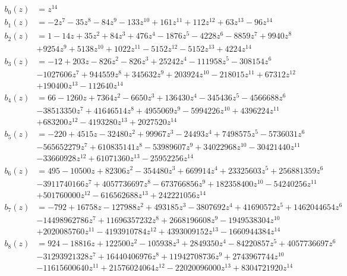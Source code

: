 \documentclass[reqno]{amsart}
\theoremstyle{definition}
\theoremstyle{remark}
\numberwithin{equation}{section}
\begin{document}
\begin{align*}
b_0(z) &= z^{14}\\
b_1(z) 
&= -2 z^7 - 35 z^8 - 84 z^9 - 133 z^{10} + 161 z^{11} + 112 z^{12} + 63 z^{13} - 96 z^{14}\\
b_2(z) 
&= 1 - 14 z + 35 z^2 + 84 z^3 + 476 z^4 - 1876 z^5 - 4228 z^6 - 8859 z^7 + 9940 z^8\\ 
&+ 9254 z^9 + 5138 z^{10} + 1022 z^{11} - 5152 z^{12} - 5152 z^{13} + 4224 z^{14}\\
b_3(z)
&= -12 + 203 z - 826 z^2 - 826 z^3 + 25242 z^4 - 111958 z^5 - 308154 z^6\\ 
&- 1027606 z^7 + 944559 z^8 + 345632 z^9 + 203924 z^{10} - 218015 z^{11} + 67312 z^{12}\\ 
&+ 190400 z^{13} - 112640 z^{14}\\
b_4(z)
&= 66 - 1260 z + 7364 z^2 - 6650 z^3 + 136430 z^4 - 345436 z^5 - 4566688 z^6\\
&- 38513350 z^7 + 41646514 z^8 + 4955069 z^9 - 5994226 z^{10} + 4396224 z^{11}\\
&+ 683200 z^{12} - 4193280 z^{13} + 2027520 z^{14}\\
b_5(z) 
&= -220 + 4515 z - 32480 z^2 + 99967 z^3 - 24493 z^4 + 7498575 z^5 - 5736031 z^6\\ 
&- 565652279 z^7 + 610835141 z^8 - 53989607 z^9 + 34022968 z^{10} - 30421440 z^{11}\\ 
&- 33660928 z^{12} + 61071360 z^{13} - 25952256 z^{14}\\
b_6(z) 
&= 495 - 10500 z + 82306 z^2 - 354480 z^3 + 669914 z^4 + 23325603 z^5 + 256881359 z^6\\
&- 3911740166 z^7 + 4057736697 z^8 - 673766856 z^9 + 182358400 z^{10} - 54240256 z^{11}\\ 
&+ 501760000 z^{12} - 616562688 z^{13} + 242221056 z^{14}\\
b_7(z)
&= -792 + 16758 z - 127988 z^2 + 493185 z^3 - 3807692 z^4 + 41690572 z^5 + 1462044654 z^6\\ 
&- 14498962786 z^7 + 11696357232 z^8 + 2668196608 z^9 - 1949538304 z^{10}\\ 
&+ 2020085760 z^{11} - 4193910784 z^{12} + 4393009152 z^{13} - 1660944384 z^{14}\\
b_8(z)
&=924 - 18816 z + 122500 z^2 - 105938 z^3 + 2849350 z^4 - 84220857 z^5 + 4057736697 z^6\\ 
&- 31293921328 z^7 + 16440406976 z^8 + 11942708736 z^9 + 2743967744 z^{10}\\ 
&- 11615600640 z^{11} + 21576024064 z^{12} - 22020096000 z^{13} + 8304721920 z^{14} \\

\end{align*}
\end{document}
